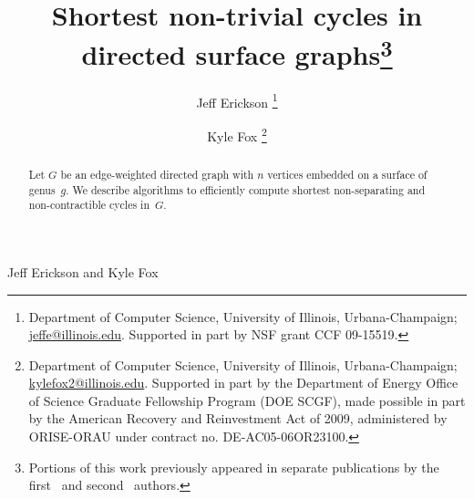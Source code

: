 \documentclass[11pt,twoside]{article}
\begin{document}
\pagestyle{myheadings}
		 {Jeff Erickson and Kyle Fox}

\begin{titlepage}

\title{Shortest non-trivial cycles in directed surface graphs\footnote{
Portions of this work previously appeared in separate publications by the first~\cite{e-sncds-11} and second~\cite{f-sntcd-13} authors.
}}

\author{
  Jeff Erickson%
  \thanks{Department of Computer Science,
  University of Illinois, Urbana-Champaign; \url{jeffe@illinois.edu}.
  Supported in part by NSF grant CCF 09-15519.
  }
  \and
  Kyle Fox%
  \thanks{Department of Computer Science,
      University of Illinois, Urbana-Champaign;
      \url{kylefox2@illinois.edu}.
      Supported in part by
      the Department of Energy Office
      of Science Graduate Fellowship Program (DOE SCGF),
      made possible in part by the American Recovery and
      Reinvestment Act of 2009, administered by ORISE-ORAU
      under contract no. DE-AC05-06OR23100.}
      }

\DRAFT

\maketitle
\begin{abstract}
Let $G$ be an edge-weighted directed graph with $n$ vertices embedded on a surface of genus~$g$.
We describe algorithms to efficiently compute shortest non-separating and non-contractible cycles in~$G$.
\end{abstract}

\noindent

\thispagestyle{empty}
\setcounter{page}{0}
\end{titlepage}







\end{document}
